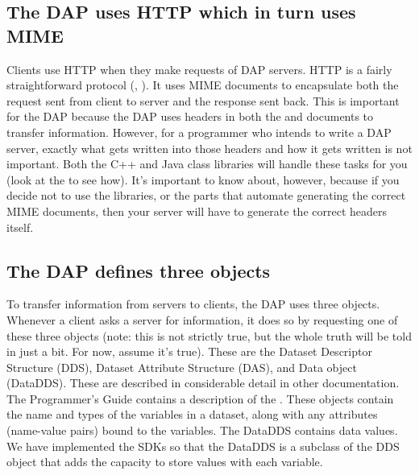 \documentclass{dods-paper}
\begin{document}
\subsection{The DAP uses HTTP which in turn uses MIME}

  

Clients use HTTP when they make requests of DAP servers. HTTP is a fairly
straightforward protocol (, ).  It uses MIME
documents to encapsulate both the request sent from client to server and the
response sent back. This is important for the DAP because the DAP uses
headers in both the 
and 
documents to transfer information.  However, for a programmer who intends to
write a DAP server, exactly what gets written into those headers and how it
gets written is not important.  Both the C++ and Java class libraries will
handle these tasks for you (look at the 
to see how). It's important to know about, however, because if you decide not
to use the libraries, or the parts that automate generating the correct MIME
documents, then your server will have to generate the correct headers itself.

\subsection{The DAP defines three objects}

To transfer information from servers to clients, the DAP uses three
objects.  Whenever a client asks a server for information, it does so
by requesting one of these three objects (note: this is not strictly
true, but the whole truth will be told in just a bit. For now, assume
it's true). These are the Dataset Descriptor Structure (DDS), Dataset
Attribute Structure (DAS), and Data object (DataDDS). These are
described in considerable detail in other documentation. The
Programmer's Guide contains a description of the .
These objects contain the name and types of the variables in a
dataset, along with any attributes (name-value pairs) bound to the
variables. The DataDDS contains data values. We have implemented the
SDKs so that the DataDDS is a subclass of the DDS object that adds the
capacity to store values with each variable.
\end{document}
